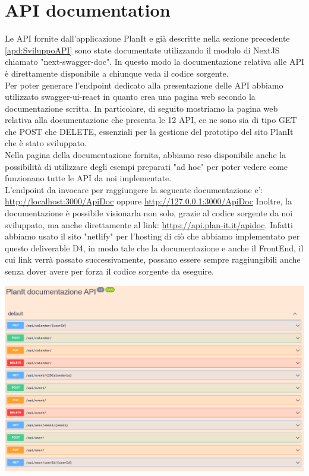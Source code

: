 \section{API documentation}
\label{secD4:APIDocumentation}
Le API fornite dall’applicazione PlanIt e già descritte nella sezione precedente \ref{apd:SviluppoAPI} sono
state documentate utilizzando il modulo di NextJS chiamato "next-swagger-doc". In questo
modo la documentazione relativa alle API è direttamente disponibile a chiunque veda il codice
sorgente.\\
Per poter generare l’endpoint dedicato alla presentazione delle API abbiamo utilizzato
swagger-ui-react in quanto crea una pagina web secondo la documentazione scritta.
In particolare, di seguito mostriamo la pagina web relativa alla documentazione che presenta
le 12 API, ce ne sono sia di tipo GET che POST che DELETE, essenziali per la gestione del prototipo del sito PlanIt che è stato sviluppato.\\
Nella pagina della documentazione fornita, abbiamo reso disponibile anche la possibilità di utilizzare degli esempi preparati "ad hoc" per poter vedere come funzionano tutte le API da noi implementate. \\
L’endpoint da invocare per raggiungere la seguente documentazione e’:
\href{http://localhost:3000/ApiDoc}{http://localhost:3000/ApiDoc} oppure \href{http://127.0.0.1:3000/ApiDoc}{http://127.0.0.1:3000/ApiDoc}
Inoltre, la documentazione è possibile visionarla non solo, grazie al codice sorgente da noi sviluppato, ma anche direttamente al link: \href{https://api.plan-it.it/apidoc}{https://api.plan-it.it/apidoc}. Infatti abbiamo usato il sito "netlify" per l'hosting di ciò che abbiamo implementato per questo deliverable D4, in modo tale che la documentazione e anche il FrontEnd, il cui link verrà passato successivamente, possano essere sempre raggiungibili anche senza dover avere per forza il codice sorgente da eseguire.
\begin{center}
    \includegraphics[width=1\textwidth, height=0.45\textheight]{img/png/documentazione.png}
\end{center}